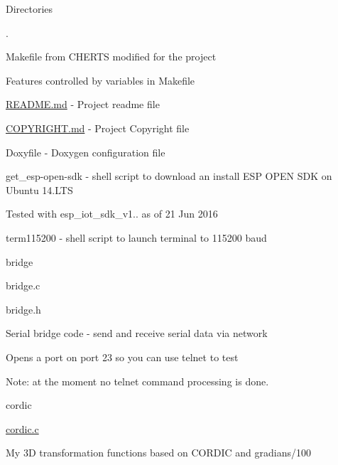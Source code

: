 \begin{DoxyParagraph}{Directories}

\begin{DoxyItemize}
\item .
\begin{DoxyItemize}
\item Makefile from C\-H\-E\-R\-T\-S modified for the project
\begin{DoxyItemize}
\item Features controlled by variables in Makefile
\end{DoxyItemize}
\item \hyperlink{README_8md}{R\-E\-A\-D\-M\-E.\-md} -\/ Project readme file
\item \hyperlink{COPYRIGHT_8md}{C\-O\-P\-Y\-R\-I\-G\-H\-T.\-md} -\/ Project Copyright file
\item Doxyfile -\/ Doxygen configuration file
\item get\-\_\-esp-\/open-\/sdk -\/ shell script to download an install E\-S\-P O\-P\-E\-N S\-D\-K on Ubuntu 14.\-L\-T\-S
\begin{DoxyItemize}
\item Tested with esp\-\_\-iot\-\_\-sdk\-\_\-v1.. as of 21 Jun 2016
\end{DoxyItemize}
\item term115200 -\/ shell script to launch terminal to 115200 baud
\end{DoxyItemize}
\item bridge
\begin{DoxyItemize}
\item bridge.\-c
\item bridge.\-h
\begin{DoxyItemize}
\item Serial bridge code -\/ send and receive serial data via network
\item Opens a port on port 23 so you can use telnet to test
\begin{DoxyItemize}
\item Note\-: at the moment no telnet command processing is done.
\end{DoxyItemize}
\end{DoxyItemize}
\end{DoxyItemize}
\item cordic
\begin{DoxyItemize}
\item \hyperlink{cordic_8c}{cordic.\-c}
\begin{DoxyItemize}
\item My 3\-D transformation functions based on C\-O\-R\-D\-I\-C and gradians/100

\end{DoxyItemize}
\end{DoxyItemize}
\end{DoxyItemize}
\end{DoxyParagraph}
